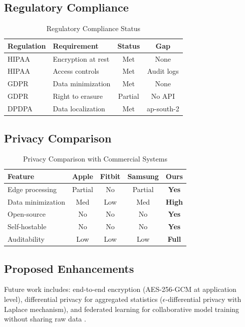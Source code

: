 \subsection{Regulatory Compliance}

\begin{table}[H]
\centering
\caption{Regulatory Compliance Status}
\label{tab:compliance}
\begin{tabular}{llcc}
\toprule
\textbf{Regulation} & \textbf{Requirement} & \textbf{Status} & \textbf{Gap} \\
\midrule
HIPAA & Encryption at rest & Met & None \\
HIPAA & Access controls & Met & Audit logs \\
GDPR & Data minimization & Met & None \\
GDPR & Right to erasure & Partial & No API \\
DPDPA & Data localization & Met & ap-south-2 \\
\bottomrule
\end{tabular}
\end{table}

\subsection{Privacy Comparison}

\begin{table}[H]
\centering
\caption{Privacy Comparison with Commercial Systems}
\label{tab:privacy}
\begin{tabular}{lcccc}
\toprule
\textbf{Feature} & \textbf{Apple} & \textbf{Fitbit} & \textbf{Samsung} & \textbf{Ours} \\
\midrule
Edge processing & Partial & No & Partial & \textbf{Yes} \\
Data minimization & Med & Low & Med & \textbf{High} \\
Open-source & No & No & No & \textbf{Yes} \\
Self-hostable & No & No & No & \textbf{Yes} \\
Auditability & Low & Low & Low & \textbf{Full} \\
\bottomrule
\end{tabular}
\end{table}

\subsection{Proposed Enhancements}
Future work includes: end-to-end encryption (AES-256-GCM at application level), differential privacy for aggregated statistics ($\epsilon$-differential privacy with Laplace mechanism), and federated learning for collaborative model training without sharing raw data \cite{federated, dp}.
